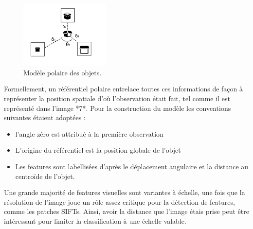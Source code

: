 \begin{figure}[H]
  \centering
  \includegraphics[width=0.4\textwidth]{object_model.png}
  \caption{Modèle polaire des objets.}
\end{figure}

Formellement, un référentiel polaire entrelace toutes ces informations
de façon à représenter la position spatiale d'où l'observation était
fait, tel comme il est représenté dans l'image *7*. Pour la
construction du modèle les conventions suivantes étaient adoptées :
\begin{itemize}
\item l'angle zéro est attribué à la première observation
\item L'origine du référentiel est la position globale de l’objet
\item Les features sont labellisées d'après le déplacement angulaire
  et la distance au centroïde de l'objet.
\end{itemize}

Une grande majorité de features visuelles sont variantes à échelle, une
fois que la résolution de l’image joue un rôle assez critique pour la
détection de features, comme les patches SIFTs. Ainsi, avoir la distance
que l’image étais prise peut être intéressant pour limiter la
classification à une échelle valable.